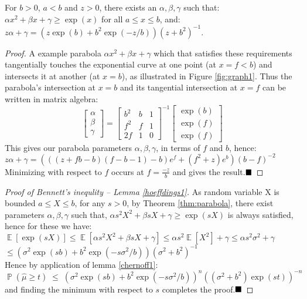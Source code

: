 \documentclass[runningheads, envcountsame, a4paper]{llncs}
\DeclareMathOperator{\E}{\mathbb{E}}
\DeclareMathOperator{\p}{\mathbb{P}}
\begin{document}
\begin{theorem}\label{thm:parabola}
For $b>0$, $a<b$ and $z>0$, there exists an $\alpha,\beta,\gamma$ such that: $\alpha x^2+\beta x+\gamma\ge \exp(x)$ for all $a\le x\le b$, and:\\
\-\hspace{3mm}$z\alpha+\gamma = (z\exp(b) + b^2\exp(-z/b))(z + b^2)^{-1}$.
\end{theorem}
\begin{proof}
A example parabola $\alpha x^2+\beta x+\gamma$ which that satisfies these requirements tangentially touches the exponential curve at one point (at $x=f<b$) and intersects it at another (at $x=b$), as illustrated in Figure \ref{fig:graph1}.
Thus the parabola's intersection at $x=b$ and its tangential intersection at $x=f$ can be written in matrix algebra:
$$
\begin{bmatrix}
    \alpha \\
    \beta \\
	\gamma
\end{bmatrix}
=
\begin{bmatrix}
    b^2 & b & 1 \\
    f^2 & f & 1 \\
	2f  & 1 & 0
\end{bmatrix}^{-1}
\begin{bmatrix}
    \exp(b) \\
    \exp(f) \\
	\exp(f)
\end{bmatrix}$$
This gives our parabola parameters $\alpha,\beta,\gamma$, in terms of $f$ and $b$, hence:\\
\-\hspace{3mm}$z\alpha+\gamma = (((z+fb-b)(f-b-1)-b)e^f+(f^2+z)e^b)(b-f)^{-2}$\\
Minimizing with respect to $f$ occurs at $f=\frac{-z}{b}$ and gives the result.$\hfill\blacksquare$
\end{proof}

\begin{proof}[Proof of Bennett's inequlity -- Lemma \ref{hoeffdings1}]
As random variable X is bounded $a\le X\le b$, for any $s>0$, by Theorem \ref{thm:parabola}, there exist parameters $\alpha,\beta,\gamma$ such that, $\alpha s^2X^2+\beta sX+\gamma\ge \exp(sX)$ is always satisfied, hence for these we have:
\-\hspace{3mm}\(\E\left[\exp(sX)\right] \le \E[\alpha s^2X^2+\beta sX+\gamma] \le \alpha s^2\E[X^2]+\gamma \le \alpha  s^2\sigma^2+\gamma\)\\
\-\hspace{20.5mm}\( \le (\sigma^2\exp(sb) + b^2\exp(-s\sigma^2/b))(\sigma^2 + b^2)^{-1}\)\\
Hence by application of lemma \ref{chernoff1}:\\
\-\hspace{3mm}\(\p(\hat{\mu}\ge t) \;\le\; (\sigma^2\exp(sb) + b^2\exp(-s\sigma^2/b))^n((\sigma^2 + b^2)\exp(st))^{-n}\)\\
and finding the minimum with respect to $s$ completes the proof.$\hfill \blacksquare$
\end{proof}
\end{document}
